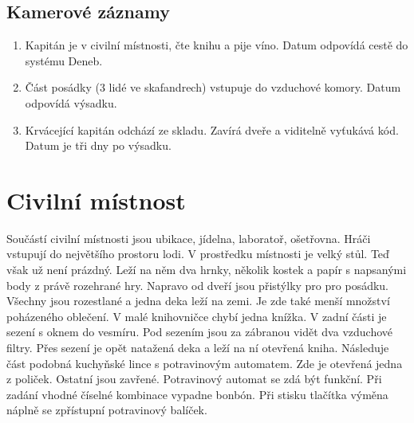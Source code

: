 \documentclass[11pt,oneside,a4paper]{article}
\begin{document}
\subsection{\texorpdfstring{Kamerové záznamy}{Kamerove zaznamy}}
\label{subsec:kamerove_zaznamy}

\begin{enumerate}
\item Kapitán je v civilní místnosti, čte knihu a pije víno. Datum odpovídá cestě do systému Deneb.
\item Část posádky (3 lidé ve skafandrech) vstupuje do vzduchové komory. Datum odpovídá výsadku.
\item Krvácející kapitán odchází ze skladu. Zavírá dveře a viditelně vyťukává kód. Datum je tři dny po výsadku.
\end{enumerate}

\section{\texorpdfstring{Civilní místnost}{Civilni mistnost}}
\label{sec:laborator}
Součástí civilní místnosti jsou ubikace, jídelna, laboratoř, ošetřovna. Hráči vstupují do největšího prostoru lodi. V prostředku místnosti je velký stůl. Teď však už není prázdný. Leží na něm dva hrnky, několik kostek a papír s napsanými body z právě rozehrané hry. Napravo od dveří jsou přistýlky pro pro posádku. Všechny jsou rozestlané a jedna deka leží na zemi. Je zde také menší množství poházeného oblečení. V malé knihovničce chybí jedna knížka. V zadní části je sezení s oknem do vesmíru. Pod sezením jsou za zábranou vidět dva vzduchové filtry. Přes sezení je opět natažená deka a leží na ní otevřená kniha. Následuje část podobná kuchyňské lince s potravinovým automatem. Zde je otevřená jedna z poliček. Ostatní jsou zavřené. Potravinový automat se zdá být funkční. Při zadání vhodné číselné kombinace vypadne bonbón. Při stisku tlačítka výměna náplně se zpřístupní potravinový balíček.
\end{document}
